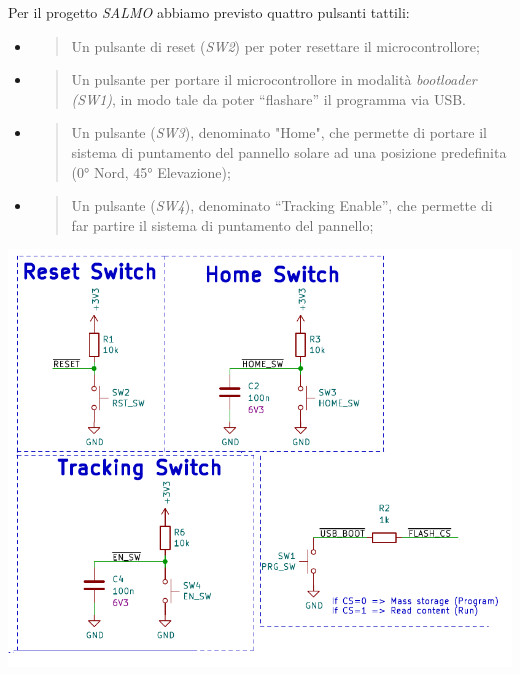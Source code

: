 Per il progetto \emph{SALMO} abbiamo previsto quattro pulsanti tattili:

\begin{itemize}
\item
  \begin{quote}
  Un pulsante di reset (\emph{SW2}) per poter resettare il
  microcontrollore;
  \end{quote}
\item
  \begin{quote}
  Un pulsante per portare il microcontrollore in modalità
  \emph{bootloader (SW1)}, in modo tale da poter ``flashare'' il
  programma via USB.
  \end{quote}
\item
  \begin{quote}
  Un pulsante (\emph{SW3}), denominato "Home", che permette di portare
  il sistema di puntamento del pannello solare ad una posizione
  predefinita (0° Nord, 45° Elevazione);
  \end{quote}
\item
  \begin{quote}
  Un pulsante (\emph{SW4}), denominato ``Tracking Enable'', che permette
  di far partire il sistema di puntamento del pannello;
  \end{quote}
\end{itemize}

\begin{center}
\includegraphics[scale=0.5]{figures/image16.png}
\captionsetup{type=figure}
\end{center}

